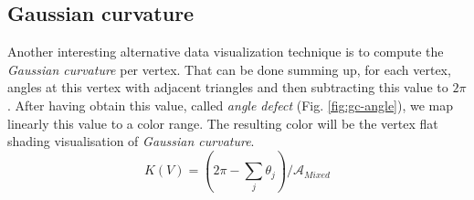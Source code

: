 \subsection{Gaussian curvature}
\label{section:vertex-area-gaussian-curvature}
Another interesting alternative data visualization technique is to compute the \textit{Gaussian curvature} per vertex. That can be done summing up, for each vertex, angles at this vertex with adjacent triangles and then subtracting this value to $2\pi$.
After having obtain this value, called \textit{angle defect} (Fig. \ref{fig:gc-angle}), we map linearly this value to a color range.
The resulting color will be the vertex flat shading visualisation of \textit{Gaussian curvature}.
$$K(V) = (2\pi - \sum_j \theta_j)/\mathcal{A}_{Mixed}$$
\begin{figure}[!h]
    \centering
    \centering
\end{figure}
